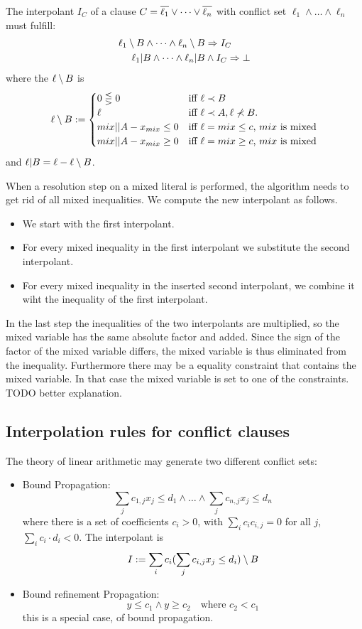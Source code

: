 \documentclass[a4paper]{article}
\begin{document}
The interpolant $I_C$ of a clause $C = \overline{\ell_1}\lor\dots\lor\overline{\ell_n}$ 
with conflict set $\ell_1 \land \dots\land \ell_n$ must fulfill:
\begin{eqnarray*}
  \ell_1\setminus B \land \dots \land \ell_n\setminus B &\Rightarrow I_C \\
  \ell_1|B \land \dots \land \ell_n|B &\land I_C \Rightarrow \bot
\end{eqnarray*}
where the $\ell\setminus B$ is
\[
\ell\setminus B := \begin{cases}
0 \lesseqgtr 0 & \mbox{iff $\ell \prec B$}\\
\ell     & \mbox{iff $\ell \prec A, \ell\not\prec B$.}\\
mix||{A} - x_{mix} \leq 0 & \mbox{iff $\ell = mix \leq c$, $mix$ is mixed} \\
mix||{A} - x_{mix} \geq 0 & \mbox{iff $\ell = mix \geq c$, $mix$ is
  mixed}
\end{cases}
\]
and $\ell|B = \ell - \ell\setminus B$.

When a resolution step on a mixed literal is performed, the algorithm needs to get rid of all mixed inequalities.  We compute the new interpolant as follows.
\begin{itemize}
\item We start with the first interpolant.
\item For every mixed inequality in the first interpolant we substitute the
  second interpolant.
\item For every mixed inequality in the inserted second interpolant, we combine it wiht the inequality of the first interpolant.
\end{itemize}

In the last step the inequalities of the two interpolants are
multiplied, so the mixed variable has the same absolute factor and
added.  Since the sign of the factor of the mixed variable differs,
the mixed variable is thus eliminated from the inequality.
Furthermore there may be a equality constraint that contains the mixed
variable.  In that case the mixed variable is set to one of the
constraints. TODO better explanation.


\subsection{Interpolation rules for conflict clauses}

The theory of linear arithmetic may generate two different conflict sets:
\begin{itemize}
\item Bound Propagation:
  \[ \sum_j c_{1,j} x_{j} \leq d_1 \land \dots \land
     \sum_j c_{n,j} x_{j} \leq d_n \]
  where there is a set of coefficients $c_i > 0$, with 
  $\sum_i c_ic_{i,j} = 0$ for
  all $j$, $\sum_i{c_i\cdot d_i} < 0$.  The interpolant
  is
  \[ I := \sum_i c_i (\sum_j c_{i,j} x_j \leq d_i)\setminus B \]
  
\item Bound refinement Propagation: 
  \[ y \leq c_1 \land y \geq c_2 \quad\mbox{where $c_2 < c_1$} \]
  this is a special case, of bound propagation.
\end{itemize}
\end{document}
